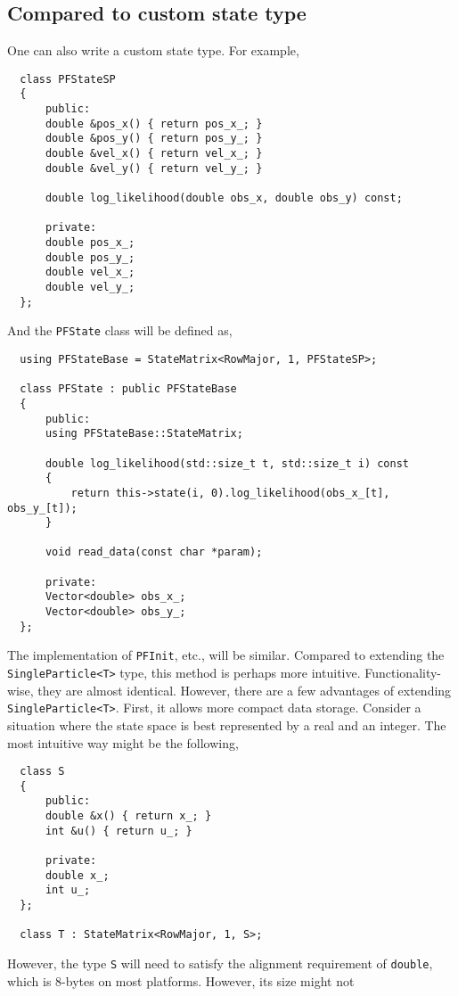 \subsection{Compared to custom state type}
\label{sub:Compared to custom state type}

One can also write a custom state type. For example,
\begin{Verbatim}
  class PFStateSP
  {
      public:
      double &pos_x() { return pos_x_; }
      double &pos_y() { return pos_y_; }
      double &vel_x() { return vel_x_; }
      double &vel_y() { return vel_y_; }

      double log_likelihood(double obs_x, double obs_y) const;

      private:
      double pos_x_;
      double pos_y_;
      double vel_x_;
      double vel_y_;
  };
\end{Verbatim}
And the \verb|PFState| class will be defined as,
\begin{Verbatim}
  using PFStateBase = StateMatrix<RowMajor, 1, PFStateSP>;

  class PFState : public PFStateBase
  {
      public:
      using PFStateBase::StateMatrix;

      double log_likelihood(std::size_t t, std::size_t i) const
      {
          return this->state(i, 0).log_likelihood(obs_x_[t], obs_y_[t]);
      }

      void read_data(const char *param);

      private:
      Vector<double> obs_x_;
      Vector<double> obs_y_;
  };
\end{Verbatim}
The implementation of \verb|PFInit|, etc., will be similar. Compared to
extending the \verb|SingleParticle<T>| type, this method is perhaps more
intuitive. Functionality-wise, they are almost identical. However, there are a
few advantages of extending \verb|SingleParticle<T>|. First, it allows more
compact data storage. Consider a situation where the state space is best
represented by a real and an integer. The most intuitive way might be the
following,
\begin{Verbatim}
  class S
  {
      public:
      double &x() { return x_; }
      int &u() { return u_; }

      private:
      double x_;
      int u_;
  };

  class T : StateMatrix<RowMajor, 1, S>;
\end{Verbatim}
However, the type \verb|S| will need to satisfy the alignment requirement of
\verb|double|, which is 8-bytes on most platforms. However, its size might not
